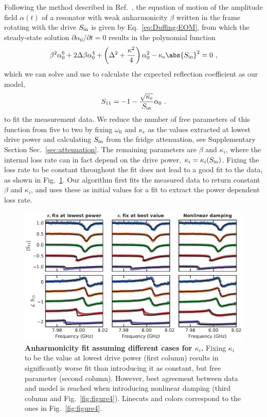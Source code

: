 Following the method described in Ref.~\cite{schmidtCurrentDetectionUsing2020}, the equation of motion of the amplitude field $\alpha(t)$ of a resonator with weak anharmonicity $\beta$ written in the frame rotating with the drive $S_{\rm in}$ is given by Eq.~\ref{eq:Duffing-EOM}, from which the steady-state solution $\partial\alpha_0/\partial t=0$ results in the polynomial function
% 
\begin{align}
\beta^2 \alpha_0^6 + 2\Delta\beta\alpha_0^4 + \left(\Delta^2+\frac{\kappa^2}{4}\right)\alpha_0^2 - \kappa_\text{e} \abs{S_{\rm in}}^2 = 0\ ,
\label{eq:polynom}
\end{align}
%
which we can solve and use to calculate the expected reflection coefficient as our model,
\begin{align}
S_{11}=-1-\frac{\sqrt{\kappa_e}}{S_{\rm in}}\alpha_0\ .
\label{eq:S11anh}
\end{align}
%
to fit the measurement data.
%
We reduce the number of free parameters of this function from five to two by fixing $\omega_0$ and $\kappa_e$ as the values extracted at lowest drive power and calculating $S_{\rm in}$ from the fridge attenuation, see Supplementary Section Sec.~\ref{sec:attenuation}.
%
The remaining parameters are $\beta$ and $\kappa_i$, where the internal loss rate can in fact depend on the drive power, $\kappa_i=\kappa_i(S_{\rm in})$.
%
Fixing the loss rate to be constant throughout the fit does not lead to a good fit to the data, as shown in Fig.~\ref{fig:SMpower}.
%
Our algorithm first fits the measured data to return constant $\beta$ and $\kappa_i$, and uses these as initial values for a fit to extract the power dependent loss rate.

\begin{figure}
	\centering
	\includegraphics[width=\linewidth]{chapter-gJJ-CPR/figs/SMFigure-power}
	\caption{
		\textbf{Anharmonicity fit assuming different cases for $\kappa_i$.}
		Fixing $\kappa_i$ to be the value at lowest drive power (first column) results in significantly worse fit than introducing it as constant, but free parameter (second column).
		However, best agreement between data and model is reached when introducing nonlinear damping (third column and Fig.~\ref{fig:figure4}).
		Linecuts and colors correspond to the ones in Fig.~\ref{fig:figure4}.
	}
	\label{fig:SMpower}
\end{figure}

